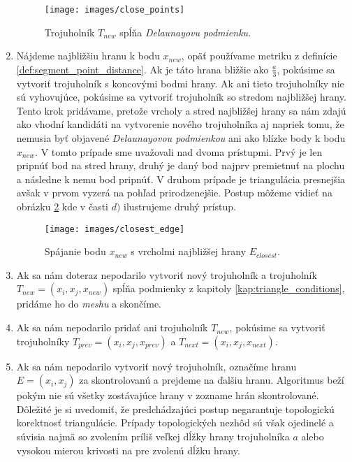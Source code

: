 \begin{enumerate}
{        \begin{figure}
            \centerline{\texttt{[image: images/close\_points]}}
            \caption[Trojuholník spĺňajúci Delaunayovu podmienku]
            {Trojuholník $T_{new}$ spĺňa \textit{Delaunayovu podmienku}.}
            \label{obr:close_points}
        \end{figure}
    }
    \item{
        Nájdeme najbližšiu hranu k bodu $x_{new}$, opäť používame metriku z definície 
        \ref{def:segment_point_distance}. Ak je táto hrana bližšie ako $\frac{a}{3}$, 
        pokúsime sa vytvoriť trojuholník s koncovými bodmi hrany. Ak ani tieto trojuholníky 
        nie sú vyhovujúce, pokúsime sa vytvoriť trojuholník so stredom najbližšej hrany.
        Tento krok pridávame, pretože
        vrcholy a stred najbližšej hrany sa nám zdajú ako vhodní kandidáti na vytvorenie nového trojuholníka
        aj napriek tomu, že nemusia byť objavené \textit{Delaunayovou podmienkou} ani ako 
        blízke body k bodu $x_{new}$. V tomto prípade sme uvažovali nad dvoma prístupmi. 
        Prvý je len pripnúť 
        bod na stred hrany, druhý je daný bod najprv premietnuť na plochu a následne k nemu bod 
        pripnúť. V druhom prípade je triangulácia presnejšia avšak v prvom vyzerá na pohľad 
        prirodzenejšie. Postup môžeme vidieť na obrázku \ref{obr:closest_edge} kde
        v časti $d)$ ilustrujeme druhý prístup.

        \begin{figure}
            \centerline{\texttt{[image: images/closest\_edge]}}
            \caption[Spájanie nového bodu s vrcholmi najbližšej hrany]
            {Spájanie bodu $x_{new}$ s vrcholmi najbližšej hrany $E_{closest}$.}
            \label{obr:closest_edge}
        \end{figure}
    }
    \item{
        Ak sa nám doteraz nepodarilo vytvoriť nový trojuholník a trojuholník $T_{new} = (x_i, x_j, x_{new})$
        spĺňa podmienky z kapitoly \ref{kap:triangle_conditions}, pridáme ho do \textit{meshu} a skončíme.
    }
    \item{
        Ak sa nám nepodarilo pridať ani trojuholník $T_{new}$, pokúsime sa vytvoriť trojuholníky 
        $T_{prev} = (x_i, x_j, x_{prev})$ a $T_{next} = (x_i, x_j, x_{next})$.
    }
    \item{
        Ak sa nám nepodarilo vytvoriť nový trojuholník, označíme hranu $E = (x_i, x_j)$ za skontrolovanú
        a prejdeme na ďalšiu hranu.
    }
    Algoritmus beží pokým nie sú všetky zostávajúce hrany v zozname hrán skontrolované. 
    Dôležité je si uvedomiť, že predchádzajúci postup negarantuje topologickú korektnosť
    triangulácie. Prípady topologických nezhôd sú však ojedinelé a súvisia najmä so zvolením príliš
    veľkej dĺžky hrany trojuholníka $a$ alebo vysokou mierou krivosti na pre zvolenú dĺžku hrany.


\end{enumerate}
